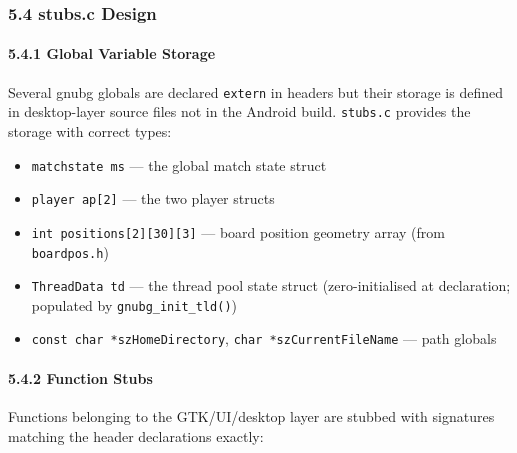 \documentclass[11pt,a4paper]{article}
\providecommand{\tightlist}{\setlength{\itemsep}{2pt}\setlength{\parskip}{0pt}}
\begin{document}
\subsubsection{5.4 stubs.c Design}\label{stubs.c-design}

\paragraph{5.4.1 Global Variable Storage}\label{global-variable-storage}

Several gnubg globals are declared \texttt{extern} in headers but their
storage is defined in desktop-layer source files not in the Android
build. \texttt{stubs.c} provides the storage with correct types:

\begin{itemize}
\tightlist
\item
  \texttt{matchstate\ ms} --- the global match state struct
\item
  \texttt{player\ ap{[}2{]}} --- the two player structs
\item
  \texttt{int\ positions{[}2{]}{[}30{]}{[}3{]}} --- board position
  geometry array (from \texttt{boardpos.h})
\item
  \texttt{ThreadData\ td} --- the thread pool state struct
  (zero-initialised at declaration; populated by
  \texttt{gnubg\_init\_tld()})
\item
  \texttt{const\ char\ *szHomeDirectory},
  \texttt{char\ *szCurrentFileName} --- path globals
\end{itemize}

\paragraph{5.4.2 Function Stubs}\label{function-stubs}

Functions belonging to the GTK/UI/desktop layer are stubbed with
signatures matching the header declarations exactly:
\end{document}
